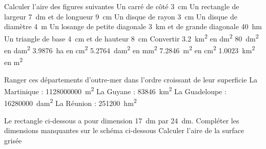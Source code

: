 \documentclass[../Cours.tex]{subfiles}
\begin{document}
\clearpage
\begin{questions}
    \exercice Calculer l'aire des figures suivantes
        \question Un carré de côté \qty{3}{cm}
        \question Un rectangle de largeur \qty{7}{dm} et de longueur \qty{9}{cm}
        \question Un disque de rayon \qty{3}{cm}
        \question Un disque de diamètre \qty{4}{m}
        \question Un losange de petite diagonale \qty{3}{km} et de grande diagonale \qty{40}{hm}
        \question Un triangle de base \qty{4}{cm} et de hauteur \qty{8}{cm}
    \exercice Convertir
        \question \qty{3,2}{km\squared} en \unit{dm\squared}
        \question \qty{80}{dm\squared} en \unit{dam\squared}
        \question \qty{3,9876}{ha} en \unit {cm\squared}
        \question \qty{5,2764}{dam\squared} en \unit{mm\squared}
        \question \qty{7,2846}{m\squared} en \unit {cm\squared}
        \question \qty{1,0023}{km\squared} en \unit{m\squared}
        
    \exercice Ranger ces départements d'outre-mer dans l'ordre croissant de leur superficie
        \question La Martinique : \qty{1128000000}{m\squared}
        \question La Guyane : \qty{83846}{km\squared}
        \question La Guadeloupe : \qty{16280000}{dam\squared}
        \question La Réunion : \qty{251200}{hm\squared}
        
    \exercice
        Le rectangle ci-dessous a pour dimension \qty{17}{dm} par \qty{24}{dm}.
        \question Compléter les dimensions manquantes sur le schéma ci-dessous
        \question Calculer l'aire de la surface grisée
        
        \begin{center}
        \end{center}
        

\end{questions}
\end{document}
